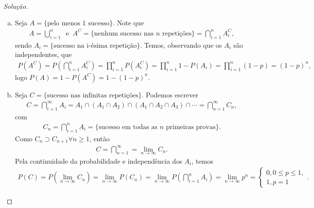 \documentclass[../Notas.tex]{subfiles}
\begin{document}
\begin{proof}[Solução]
\begin{enumerate}[(a)]
    \item Seja $A = \{ \text{pelo menos 1 sucesso} \}$. Note que
    \begin{align*}
        A = \bigcup_{i=1}^{n} \ \text{ e } \ A^C = \{ \text{nenhum sucesso nas } n \text{ repetições} \} = \bigcap_{i=1}^{n}A_i^C,
    \end{align*}
    sendo $A_i = \{\text{sucesso na i-ésima repetição}\}$. Temos, observando que os $A_i$ são independentes, que
    \begin{align*}
        P(A^C) = P\left( \bigcap_{i=1}^{n}A_i^C \right) = \prod_{i=1}^{n} P(A_i^C) = \prod_{i=1}^{n}1 - P(A_i) = \prod_{i=1}^{n}(1-p) = (1-p)^n,
    \end{align*}
    logo $P(A) = 1 - P(A^C) = 1 - (1-p)^n$.
    
    \item Seja $C = \{ \text{sucesso nas infinitas repetições} \}$. Podemos escrever
    \begin{align*}
        C = \bigcap_{i=1}^{\infty}A_i = A_1\cap(A_1\cap A_2)\cap(A_1\cap A_2\cap A_3)\cap\cdots = \bigcap_{n=1}^{\infty}C_n,
    \end{align*}
    com 
    \begin{align*}
        C_n = \bigcap_{i=1}^{n}A_i = \{\text{sucesso em todas as } n \text{ primeiras provas}\}.
    \end{align*}
    Como $C_n\supset C_{n+1} \forall n\geq 1$, então
    \begin{align*}
        C = \bigcap_{n=1}^{\infty} = \lim_{n\to\infty}C_n.
    \end{align*}
    Pela continuidade da probabilidade e independência dos $A_i$, temos
    \begin{align*}
        P(C) = P\left( \lim_{n\to\infty} C_n \right) = \lim_{n\to\infty}P(C_n) = \lim_{n\to\infty} P\left( \bigcap_{i=1}^{n}A_i \right) = \lim_{n\to\infty} p^n = \begin{cases}
        0, 0\leq p\leq 1, \\
        1, p = 1
        \end{cases}.
    \end{align*}
\end{enumerate}
\end{proof}
\end{document}

